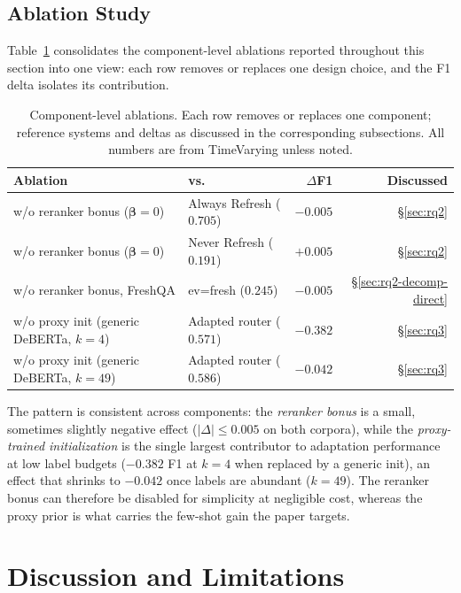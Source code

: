 \documentclass[pdflatex,sn-basic]{sn-jnl}
\begin{document}
\subsection{Ablation Study}
\label{sec:ablation}

Table~\ref{tab:ablation} consolidates the component-level ablations reported throughout this section into one view: each row removes or replaces one design choice, and the F1 delta isolates its contribution.

\begin{table}[htbp]
\caption{Component-level ablations. Each row removes or replaces one component; reference systems and deltas as discussed in the corresponding subsections. All numbers are from TimeVarying unless noted.}
\label{tab:ablation}
\centering
\begin{tabular}{llrr}
\toprule
Ablation & vs. & $\Delta$F1 & Discussed \\
\midrule
w/o reranker bonus ($\boldsymbol{\beta}{=}0$) & Always Refresh ($0.705$) & $-0.005$ & §\ref{sec:rq2} \\
w/o reranker bonus ($\boldsymbol{\beta}{=}0$) & Never Refresh ($0.191$) & $+0.005$ & §\ref{sec:rq2} \\
w/o reranker bonus, FreshQA & ev=fresh ($0.245$) & $-0.005$ & §\ref{sec:rq2-decomp-direct} \\
\midrule
w/o proxy init (generic DeBERTa, $k{=}4$) & Adapted router ($0.571$) & $-0.382$ & §\ref{sec:rq3} \\
w/o proxy init (generic DeBERTa, $k{=}49$) & Adapted router ($0.586$) & $-0.042$ & §\ref{sec:rq3} \\
\bottomrule
\end{tabular}
\end{table}

The pattern is consistent across components: the \emph{reranker bonus} is a small, sometimes slightly negative effect ($|\Delta| \le 0.005$ on both corpora), while the \emph{proxy-trained initialization} is the single largest contributor to adaptation performance at low label budgets ($-0.382$ F1 at $k{=}4$ when replaced by a generic init), an effect that shrinks to $-0.042$ once labels are abundant ($k{=}49$). The reranker bonus can therefore be disabled for simplicity at negligible cost, whereas the proxy prior is what carries the few-shot gain the paper targets.

\section{Discussion and Limitations}
\label{sec:discussion}
\end{document}
